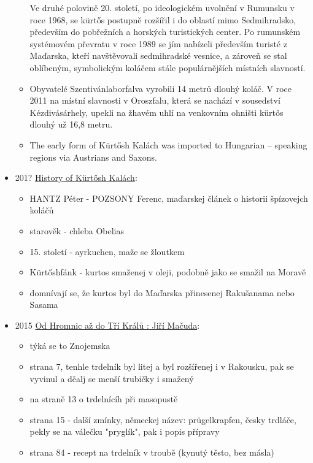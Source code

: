 \begin{itemize}
\begin{itemize}
    Ve druhé polovině 20. století, po ideologickém uvolnění v Rumunsku v
    roce 1968, se kürtős postupně rozšířil i do oblastí mimo
    Sedmihradsko, především do pobřežních a horských turistických
    center. Po rumunském systémovém převratu v roce 1989 se jím nabízeli
    především turisté z Maďarska, kteří navštěvovali sedmihradské
    vesnice, a zároveň se stal oblíbeným, symbolickým koláčem stále
    populárnějších místních slavností.
  \item
    Obyvatelé Szentivánlaborfalva vyrobili 14 metrů dlouhý koláč. V roce
    2011 na místní slavnosti v Oroszfalu, která se nachází v sousedství
    Kézdivásárhely, upekli na žhavém uhlí na venkovním ohništi kürtős
    dlouhý už 16,8 metru.
  \item
    The early form of Kürtősh Kalách was imported to Hungarian --
    speaking regions via Austrians and Saxons.
  \end{itemize}
\item
  201?
  \href{https://web.archive.org/web/20201230125626/http://kurtos.eu/history}{History
  of Kürtősh Kalách}:

  \begin{itemize}
  \tightlist
  \item
    HANTZ Péter - POZSONY Ferenc, maďarskej článek o historii špízovejch
    koláčů
  \item
    starověk - chleba Obelias
  \item
    15. století - ayrkuchen, maže se žloutkem
  \item
    Kürtőshfánk - kurtos smaženej v oleji, podobně jako se smažil na
    Moravě
  \item
    domnívají se, že kurtos byl do Maďarska přinesenej Rakušanama nebo
    Sasama
  \end{itemize}
\item
  2015
  \href{http://zivepomezi.cz/wp-content/uploads/2014/12/Publikace-zvyky_vnit.blok_.pdf}{Od
  Hromnic až do Tří Králů : Jiří Mačuda}:

  \begin{itemize}
  \tightlist
  \item
    týká se to Znojemska
  \item
    strana 7, tenhle trdelník byl litej a byl rozšířenej i v Rakousku,
    pak se vyvinul a děalj se menší trubičky i smažený
  \item
    na straně 13 o trdelnícíh při masopustě
  \item
    strana 15 - další zmínky, německej název: prügelkrapfen, česky
    trdláče, pekly se na válečku "pryglík", pak i popis přípravy
  \item
    strana 84 - recept na trdelník v troubě (kynutý těsto, bez másla)


\end{itemize}
\end{itemize}
